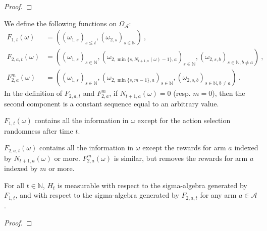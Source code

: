 \begin{proof}\leanok

\end{proof}


\begin{definition}\label{def:AM.probSpaceSubsets}
  \leanok
We define the following functions on $\Omega_{\mathcal{A}}$:
\begin{align*}
  F_{1, t}(\omega) &= ((\omega_{1,s})_{s \le t}, (\omega_{2,s})_{s \in \mathbb{N}})
  \: , \\
  F_{2, a, t}(\omega) &= ((\omega_{1,s})_{s \in \mathbb{N}}, (\omega_{2, \min\{s,N_{t+1,a}(\omega)-1\}, a})_{s \in \mathbb{N}}, (\omega_{2, s, b})_{s \in \mathbb{N}, b \ne a})
  \: , \\
  F_{2, a}^m(\omega) &= ((\omega_{1,s})_{s \in \mathbb{N}}, (\omega_{2, \min\{s,m-1\}, a})_{s \in \mathbb{N}}, (\omega_{2, s, b})_{s \in \mathbb{N}, b \ne a})
  \: .
\end{align*}
In the definition of $F_{2, a, t}$ and $F_{2, a}^m$, if $N_{t+1,a}(\omega) = 0$ (resp. $m = 0$), then the second component is a constant sequence equal to an arbitrary value.

$F_{1, t}(\omega)$ contains all the information in $\omega$ except for the action selection randomness after time $t$.

$F_{2, a, t}(\omega)$ contains all the information in $\omega$ except the rewards for arm $a$ indexed by $N_{t+1,a}(\omega)$ or more.
$F_{2, a}^m(\omega)$ is similar, but removes the rewards for arm $a$ indexed by $m$ or more.
\end{definition}


\begin{lemma}\label{lem:AM.measurable_hist_comap}
\leanok
For all $t \in \mathbb{N}$, $H_t$ is measurable with respect to the sigma-algebra generated by $F_{1, t}$, and with respect to the sigma-algebra generated by $F_{2, a, t}$ for any arm $a \in \mathcal{A}$.
\end{lemma}

\begin{proof}\leanok

\end{proof}


